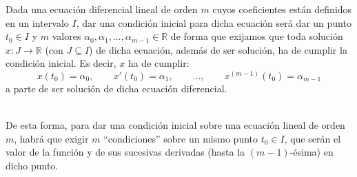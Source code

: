 \begin{definicion}
    Dada una ecuación diferencial lineal de orden $m$ cuyos coeficientes están definidos en un intervalo $I$, dar una condición inicial para dicha ecuación será dar un punto $t_0\in I$ y $m$ valores $\alpha_0,\alpha_1,\ldots,\alpha_{m-1}\in \mathbb{R}$ de forma que exijamos que toda solución $x:J\rightarrow\mathbb{R}$ (con $J\subseteq I$) de dicha ecuación, además de ser solución, ha de cumplir la condición inicial. Es decir, $x$ ha de cumplir:
    \begin{equation*}
        x(t_0) = \alpha_0, \qquad x'(t_0) = \alpha_1,\qquad  \ldots, \qquad  x^{(m-1)}(t_0) = \alpha_{m-1}
    \end{equation*}
    a parte de ser solución de dicha ecuación diferencial.
\end{definicion}~\\

De esta forma, para dar una condición inicial sobre una ecuación lineal de orden $m$, habrá que exigir $m$ ``condiciones'' sobre un mismo punto $t_0\in I$, que serán el valor de la función y de sus sucesivas derivadas (hasta la $(m-1)$-ésima) en dicho punto.

